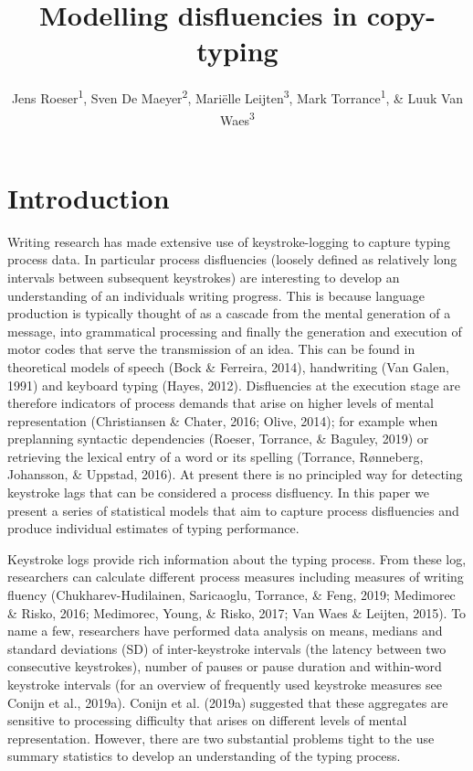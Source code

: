 \documentclass[
  english,
  man,mask,floatsintext]{apa7}
\author{Jens Roeser\textsuperscript{1}, Sven De Maeyer\textsuperscript{2}, Mariëlle Leijten\textsuperscript{3}, Mark Torrance\textsuperscript{1}, \& Luuk Van Waes\textsuperscript{3}}
\affiliation{
\vspace{0.5cm}
\textsuperscript{1} Department of Psychology, Nottingham Trent University, United Kingdom\\\textsuperscript{2} Faculty of Social Sciences, University of Antwerp, Belgium\\\textsuperscript{3} Department of Management, University of Antwerp, Belgium}
\title{Modelling disfluencies in copy-typing}
\date{}
\begin{document}
\maketitle

\hypertarget{introduction}{%
\section{Introduction}\label{introduction}}

Writing research has made extensive use of keystroke-logging to capture typing process data. In particular process disfluencies (loosely defined as relatively long intervals between subsequent keystrokes) are interesting to develop an understanding of an individuals writing progress. This is because language production is typically thought of as a cascade from the mental generation of a message, into grammatical processing and finally the generation and execution of motor codes that serve the transmission of an idea. This can be found in theoretical models of speech (Bock \& Ferreira, 2014), handwriting (Van Galen, 1991) and keyboard typing (Hayes, 2012). Disfluencies at the execution stage are therefore indicators of process demands that arise on higher levels of mental representation (Christiansen \& Chater, 2016; Olive, 2014); for example when preplanning syntactic dependencies (Roeser, Torrance, \& Baguley, 2019) or retrieving the lexical entry of a word or its spelling (Torrance, Rønneberg, Johansson, \& Uppstad, 2016). At present there is no principled way for detecting keystroke lags that can be considered a process disfluency. In this paper we present a series of statistical models that aim to capture process disfluencies and produce individual estimates of typing performance.

Keystroke logs provide rich information about the typing process. From these log, researchers can calculate different process measures including measures of writing fluency (Chukharev-Hudilainen, Saricaoglu, Torrance, \& Feng, 2019; Medimorec \& Risko, 2016; Medimorec, Young, \& Risko, 2017; Van Waes \& Leijten, 2015). To name a few, researchers have performed data analysis on means, medians and standard deviations (SD) of inter-keystroke intervals (the latency between two consecutive keystrokes), number of pauses or pause duration and within-word keystroke intervals (for an overview of frequently used keystroke measures see Conijn et al., 2019a). Conijn et al. (2019a) suggested that these aggregates are sensitive to processing difficulty that arises on different levels of mental representation. However, there are two substantial problems tight to the use summary statistics to develop an understanding of the typing process.
\end{document}

